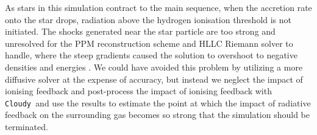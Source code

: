 \documentclass[graphics, twocolumn, usenatbib]{mn2e}
\newcommand{\cloudy}{\texttt{Cloudy~}}
\begin{document}
As stars in this simulation contract to the main sequence, when the accretion rate onto the
star drops, radiation above the hydrogen ionisation threshold is not initiated. The shocks generated near
the star particle are too strong and unresolved for the PPM reconstruction scheme and HLLC Riemann solver
to handle, where the steep gradients caused the solution to overshoot to negative densities and
energies \citep[see][for details]{Enzo_2014}. We could have avoided this problem by utilizing a more
diffusive solver at the expense of accuracy, but instead
we neglect the impact of ionising feedback and post-process the impact of
ionising feedback with \cloudy and use the results to estimate the point at which the impact of
radiative feedback on the surrounding gas becomes so strong that the simulation should be terminated.
\end{document}
